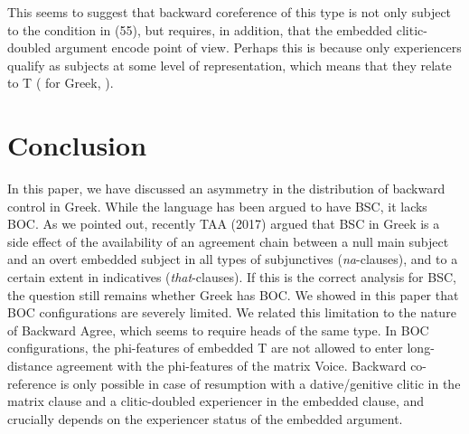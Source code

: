 \documentclass[output=paper]{langsci/langscibook}
\begin{document}
\ea%
    \label{ex:alexiadou:57}
    \z
\z    

This seems to suggest that backward coreference of this type is not only subject to the condition in (55), but requires, in addition, that the embedded clitic-doubled argument encode point of view. Perhaps this is because only experiencers qualify as subjects at some level of representation, which means that they relate to T (\citealt{Anagnostopoulou1999} for Greek, \citealt{Landau2010}). 

\section{Conclusion}%

In this paper, we have discussed an asymmetry in the distribution of backward control in Greek. While the language has been argued to have BSC, it lacks BOC. As we pointed out, recently TAA (2017) argued that BSC in Greek is a side effect of the availability of an agreement chain between a null main subject and an overt embedded subject in all types of subjunctives (\textit{na}{}-clauses), and to a certain extent in indicatives (\textit{that}{}-clauses). If this is the correct analysis for BSC, the question still remains whether Greek has BOC. We showed in this paper that BOC configurations are severely limited. We related this limitation to the nature of Backward Agree, which seems to require heads of the same type. In BOC configurations, the phi-features of embedded T are not allowed to enter long-distance agreement with the phi-features of the matrix Voice. Backward co-reference is only possible in case of resumption with a dative/genitive clitic in the matrix clause and a clitic-doubled experiencer in the embedded clause, and crucially depends on the experiencer status of the embedded argument.
\end{document}
